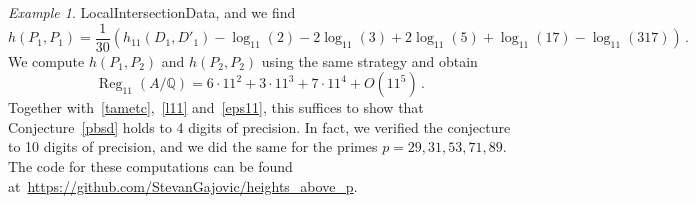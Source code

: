 \documentclass[11pt, a4paper]{amsart}
\newcommand{\Q}{\mathbb{Q}}
\newcommand{\Reg}{\operatorname{Reg}}
\theoremstyle{remark}
\newtheorem{example}[theorem]{Example}
\numberwithin{equation}{section}
\begin{document}
\begin{example}
{LocalIntersectionData}, and we find
$$
h(P_1, P_1) = \frac{1}{30}(h_{11}(D_1,D'_1) -\log_{11}(2)
-2\log_{11}(3)+2\log_{11}(5)+\log_{11}(17)-\log_{11}(317))\,.
$$
We compute $h(P_1,P_2)$ and $h(P_2,P_2)$ using the same strategy and obtain
$$
\Reg_{11}(A/\Q)=6\cdot 11^2 + 3\cdot 11^3 + 7\cdot 11^4 + O(11^5)\,.
$$
Together with~\eqref{tametc},~\eqref{l11} and~\eqref{eps11}, this suffices
to show that Conjecture~\ref{pbsd} holds to 4 digits of precision. 
In fact, we verified the conjecture to 10 digits of precision, and we
did the same for the primes $p=29,31,53,71,89$.
The code for these computations can be found
at~{\url{https://github.com/StevanGajovic/heights_above_p}}. 



\end{example}







\end{document}
